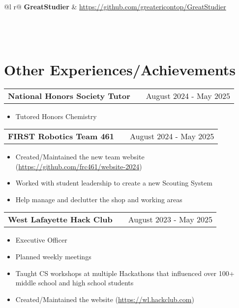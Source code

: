 \documentclass[letter, 12pt]{article}
\makeatletter
\newenvironment{jobshort}[2]
    {
    \begin{tabularx}{\linewidth}{@{}l X r@{}}
    \textbf{#1} & \hfill & #2 \\[3.75pt]
    \end{tabularx}
    }
    {
    }
\makeatother
\begin{document}
\begin{tabularx}{\linewidth}{ @{}l r@{} }
    \textbf{GreatStudier} & \hfill \href{https://github.com/greatericontop/GreatStudier}{https://github.com/greatericontop/GreatStudier} \\[3.75pt]
     \\
     \\
     \\
\end{tabularx}

\section{Other Experiences/Achievements}

\begin{jobshort}{National Honors Society Tutor}{August 2024 - May 2025}
    \begin{itemize}
        \item Tutored Honors Chemistry
    \end{itemize}
\end{jobshort}

\begin{jobshort}{FIRST Robotics Team 461}{August 2024 - May 2025}
    \begin{itemize}
        \item Created/Maintained the new team website (\href{https://github.com/frc461/website-2024}{https://github.com/frc461/website-2024})
        \item Worked with student leadership to create a new Scouting System
        \item Help manage and declutter the shop and working areas
    \end{itemize}
\end{jobshort}

\begin{jobshort}{West Lafayette Hack Club}{August 2023 - May 2025}
    \begin{itemize}
        \item Executive Officer
        \item Planned weekly meetings
        \item Taught CS workshops at multiple Hackathons that influenced over 100+ middle school and high school students
        \item Created/Maintained the website (\href{https://wl.hackclub.com/}{https://wl.hackclub.com})
    \end{itemize}
\end{jobshort}
\end{document}
